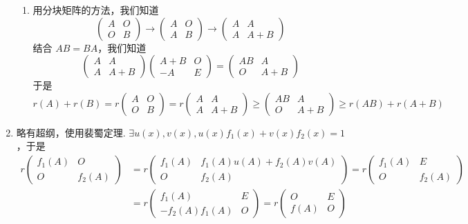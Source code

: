 \begin{enumerate}
\begin{enumerate}
              \item 用分块矩阵的方法，我们知道
                    \[\begin{pmatrix}A & O \\ O & B\end{pmatrix}\rightarrow \begin{pmatrix}A & O \\ A & B\end{pmatrix}\rightarrow \begin{pmatrix}A & A \\ A & A+B\end{pmatrix}\]
                    结合 $AB=BA$，我们知道
                    \[\begin{pmatrix}A & A \\ A & A+B\end{pmatrix}\begin{pmatrix}A+B & O \\ -A & E\end{pmatrix}=\begin{pmatrix}AB & A \\ O & A+B\end{pmatrix}\]
                    于是
                    \[r(A)+r(B)=r\begin{pmatrix}A & O \\ O & B\end{pmatrix}=r\begin{pmatrix}A & A \\ A & A+B\end{pmatrix}\geqslant \begin{pmatrix}AB & A \\ O & A+B\end{pmatrix}\geqslant r(AB)+r(A+B)\]
          \end{enumerate}

    \item 略有超纲，使用裴蜀定理. $\exists u(x),v(x),u(x)f_1(x)+v(x)f_2(x)=1 $，于是
          \begin{align*}
              r\begin{pmatrix}f_1(A) & O \\ O & f_2(A)\end{pmatrix} & = r\begin{pmatrix}f_1(A) & f_1(A)u(A)+f_2(A)v(A) \\ O & f_2(A)\end{pmatrix}=r\begin{pmatrix}f_1(A) & E \\ O & f_2(A)\end{pmatrix} \\
                                                                    & =r\begin{pmatrix}f_1(A) & E \\ -f_2(A)f_1(A) & O\end{pmatrix}=r\begin{pmatrix}O & E \\ f(A) & O\end{pmatrix}
          \end{align*}


\end{enumerate}
